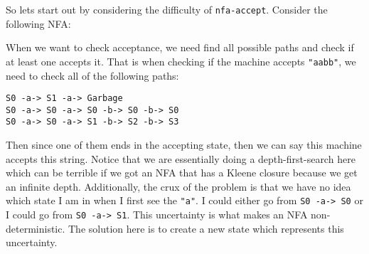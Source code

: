 \documentclass[main.tex]{subfiles}
\begin{document}
So lets start out by considering the difficulty of \texttt{nfa-accept}. Consider the following NFA:
\begin{center}
\end{center}

When we want to check acceptance, we need find all possible paths and check if at least one accepts it. 
That is when checking if the machine accepts \texttt{"aabb"}, we need to check all of the following paths:
\begin{center}
    \texttt{S0 -a-> S1 -a-> Garbage}\\
    \texttt{S0 -a-> S0 -a-> S0 -b-> S0 -b-> S0}\\
    \texttt{S0 -a-> S0 -a-> S1 -b-> S2 -b-> S3}
\end{center}

Then since one of them ends in the accepting state, then we can say this machine accepts this string. 
Notice that we are essentially doing a depth-first-search here which can be terrible if we got an NFA that has a Kleene closure because we get an infinite depth.
Additionally, the crux of the problem is that we have no idea which state I am in when I first see the \texttt{"a"}. I could either go from \texttt{S0 -a-> S0} or I could go from \texttt{S0 -a-> S1}. This uncertainty is what makes an NFA non-deterministic. The solution here is to create a new state which represents this uncertainty. 
\end{document}
